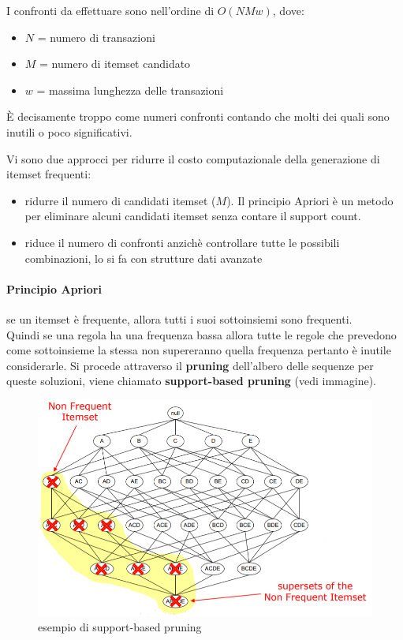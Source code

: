 I confronti da effettuare sono nell'ordine di $O(NMw)$, dove:
\begin{itemize}
	\item $N$ = numero di transazioni
	\item $M$ = numero di itemset candidato
	\item $w$ = massima lunghezza delle transazioni
\end{itemize} 

È decisamente troppo come numeri confronti contando che molti dei quali sono inutili o poco significativi.

Vi sono due approcci per ridurre il costo computazionale della generazione di itemset frequenti:
\begin{itemize}
	\item ridurre il numero di candidati itemset ($M$). Il principio Apriori \`e un metodo per eliminare alcuni candidati itemset senza contare il support count. 
	\item riduce il numero di confronti anzich\`e controllare tutte le possibili combinazioni, lo si fa con strutture dati avanzate
\end{itemize}

\paragraph{Principio Apriori} se un itemset \`e frequente, allora tutti i suoi sottoinsiemi sono frequenti.\\
Quindi se una regola ha una frequenza bassa allora tutte le regole che prevedono come sottoinsieme la stessa non supereranno quella frequenza pertanto \`e inutile considerarle. Si procede attraverso il \textbf{pruning} dell'albero delle sequenze per queste soluzioni, viene chiamato \textbf{support-based pruning} (vedi immagine).

\begin{figure}[H]
	\centering
	\includegraphics[height=0.5 \linewidth]{association/pict/pruning.png}
	\caption{esempio di support-based pruning}
\end{figure}

